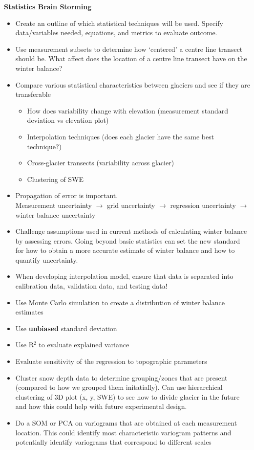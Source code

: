 \documentclass[12pt]{article}
\begin{document}
\noindent \textbf{Statistics Brain Storming}
\begin{itemize}
\item Create an outline of which statistical techniques will be used. Specify data/variables needed, equations, and metrics to evaluate outcome. 
\item Use measurement subsets to determine how `centered' a centre line transect should be. What affect does the location of a centre line transect have on the winter balance?
\item Compare various statistical characteristics between glaciers and see if they are transferable
\begin{itemize}
\item How does variability change with elevation (measurement standard deviation vs elevation plot)
\item Interpolation techniques (does each glacier have the same best technique?) 
\item Cross-glacier transects (variability across glacier)
\item Clustering of SWE
\end{itemize}
\item Propagation of error is important. \\
Measurement uncertainty $\rightarrow$ grid uncertainty $\rightarrow$ regression uncertainty $\rightarrow$ winter balance uncertainty
\item Challenge assumptions used in current methods of calculating winter balance by assessing errors. Going beyond basic statistics can set the new standard for how to obtain a more accurate estimate of winter balance and how to quantify uncertainty. 
\item When developing interpolation model, ensure that data is separated into calibration data, validation data, and testing data!
\item Use Monte Carlo simulation to create a distribution of winter balance estimates
\item Use \textbf{unbiased} standard deviation
\item Use R$^2$ to evaluate explained variance
\item Evaluate sensitivity of the regression to topographic parameters
\item Cluster snow depth data to determine grouping/zones that are present (compared to how we grouped them initatially). Can use hierarchical clustering of 3D plot (x, y, SWE)  to see how to divide glacier in the future and how this could help with future experimental design.
\item Do a SOM or PCA on variograms that are obtained at each measurement location. This could identify most characteristic variogram patterns and potentially identify variograms that correspond to different scales
\end{itemize}
\end{document}
